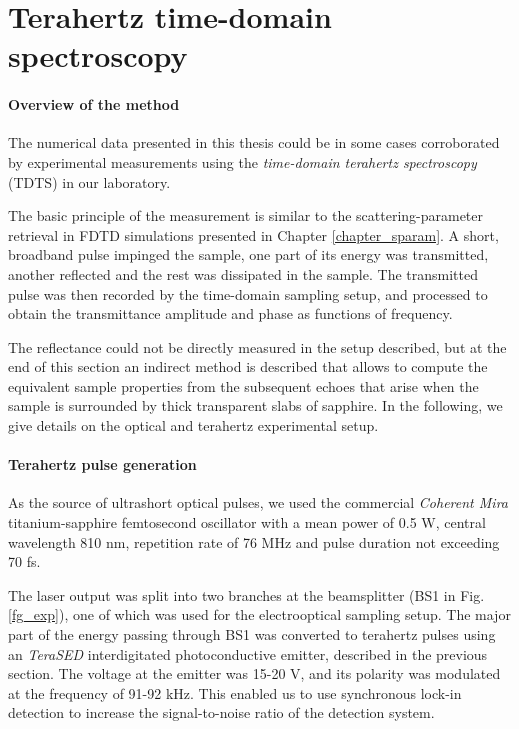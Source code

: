 
\section{Terahertz time-domain spectroscopy} \label{sect_tdts} 
\paragraph{Overview of the method}%
The numerical data presented in this thesis could be in some cases corroborated by experimental measurements using the \textit{time-domain terahertz spectroscopy} (TDTS) in our laboratory. 

The basic principle of the measurement is similar to the scattering-parameter retrieval in FDTD simulations presented in Chapter \ref{chapter_sparam}.
 A short, broadband pulse impinged the sample, one part of its energy was transmitted, another reflected and the rest was dissipated in the sample. The transmitted pulse was then recorded by the time-domain sampling setup, and processed to obtain the transmittance amplitude and phase as functions of frequency.

The reflectance could not be directly measured in the setup described, but at the end of this section an indirect method is described that allows to compute the equivalent sample properties from the subsequent echoes that arise when the sample is surrounded by thick transparent slabs of sapphire. 
In the following, we give details on the optical and terahertz experimental setup.
\paragraph{Terahertz pulse generation}%
As the source of ultrashort optical pulses, we used the commercial \textit{Coherent Mira} titanium-sapphire femtosecond oscillator with a mean power of 0.5 W, central wavelength 810 nm, repetition rate of 76 MHz and pulse duration not exceeding 70 fs.  

The laser output was split into two branches at the beamsplitter (BS1 in Fig. \ref{fg_exp}), one of which was used for the electrooptical sampling setup. The major part of the energy passing through BS1 was converted to terahertz pulses using an \textit{TeraSED} interdigitated photoconductive emitter, described in the previous section. 
The voltage at the emitter was 15-20 V, and its polarity was modulated at the frequency of 91-92 kHz. This enabled us to use synchronous lock-in detection to increase the signal-to-noise ratio of the detection system. %

